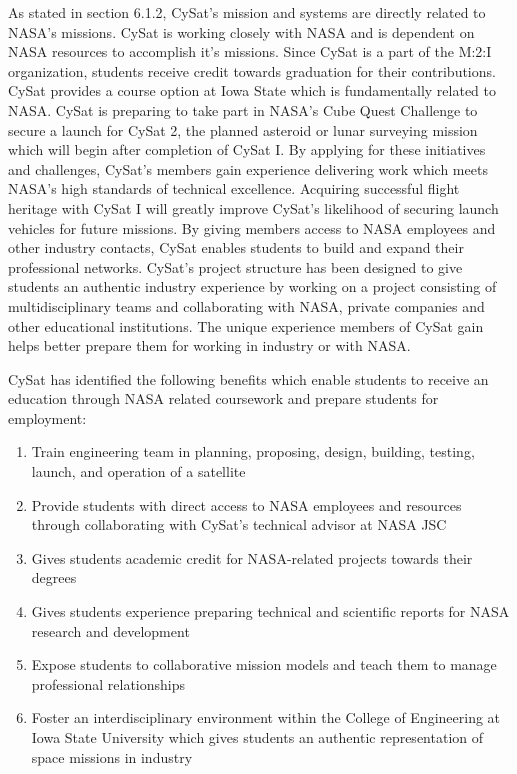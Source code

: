 \documentclass[nocover]            %
{CSLI}                       %
\begin{document}
As stated in section 6.1.2, CySat's mission and systems are directly related to NASA's missions. CySat is working closely with NASA and is dependent on NASA resources to accomplish it's missions. Since CySat is a part of the M:2:I organization, students receive credit towards graduation for their contributions.  CySat provides a course option at Iowa State which is fundamentally related to NASA. CySat is preparing to take part in NASA's Cube Quest Challenge to secure a launch for CySat 2, the planned asteroid or lunar surveying mission which will begin after completion of CySat I. By applying for these initiatives and challenges, CySat's members gain experience delivering work which meets NASA's high standards of technical excellence. Acquiring successful flight heritage with CySat I will greatly improve CySat's likelihood of securing launch vehicles for future missions. By giving members access to NASA employees and other industry contacts, CySat enables students to build and expand their professional networks. CySat's project structure has been designed to give students an authentic industry experience by working on a project consisting of multidisciplinary teams and collaborating with NASA, private companies and other educational institutions. The unique experience members of CySat gain helps better prepare them for working in industry or with NASA.

CySat has identified the following benefits which enable students to receive an education through NASA related coursework and prepare students for employment:
\begin{enumerate}
\item{Train engineering team in planning, proposing, design, building, testing, launch, and operation of a satellite}
\item{Provide students with direct access to NASA employees and resources through collaborating with CySat's technical advisor at NASA JSC}
\item{Gives students academic credit for NASA-related projects towards their degrees}
\item{Gives students experience preparing technical and scientific reports for NASA research and development}
\item{Expose students to collaborative mission models and teach them to manage professional relationships}
\item{Foster an interdisciplinary environment within the College of Engineering at Iowa State University which gives students an authentic representation of space missions in industry}
\end{enumerate}
\end{document}
